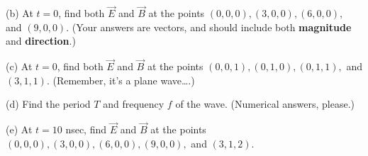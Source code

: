 (b) At $t=0$, find both $\vec E$ and $\vec B$ at the points $(0,0,0), (3,0,0), (6,0,0),$ and $(9,0,0)$.  (Your answers are vectors, and should include both \textbf{magnitude} and \textbf{direction}.) 
\vspace{1.0in}

(c) At $t=0$, find both $\vec E$ and $\vec B$ at the points $(0,0,1), (0,1,0), (0,1,1),$ and $(3,1,1)$.  (Remember, it's a plane wave….)
\vspace{1.0in}

(d)  Find the period $T$ and frequency $f$ of the wave.  (Numerical answers, please.)
\vspace{1.0in}

(e)  At $t=10$ nsec, find $\vec E$ and $\vec B$ at the points $(0,0,0), (3,0,0), (6,0,0), (9,0,0),$ and $(3,1,2)$.  
\vspace{1.0in}


